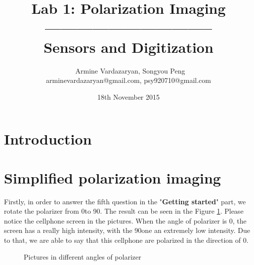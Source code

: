 \documentclass[english]{article}
\begin{document}
\title{Lab 1: Polarization Imaging\\ -------------------------------- \\ \Large Sensors and Digitization}
\author{ \ Armine Vardazaryan, Songyou Peng \\ arminevardazaryan@gmail.com, psy920710@gmail.com}
\date{18th November 2015}

\maketitle

\section{Introduction}

\section{Simplified polarization imaging}
Firstly, in order to answer the fifth question in the "\textbf{Getting started}" part, we rotate the polarizer from 0\textdegree to 90\textdegree. The result can be seen in the Figure \ref{fig:one}. Please notice the cellphone screen in the pictures. When the angle of polarizer is 0\textdegree, the screen has a really high intensity, with the 90\textdegree one an extremely low intensity. Due to that, we are able to say that this cellphone are polarized in the direction of 0\textdegree.\\

\begin{figure}[H]
	\centering
	\caption{Pictures in different angles of polarizer}
	\label{fig:one}
\end{figure}
\end{document}
